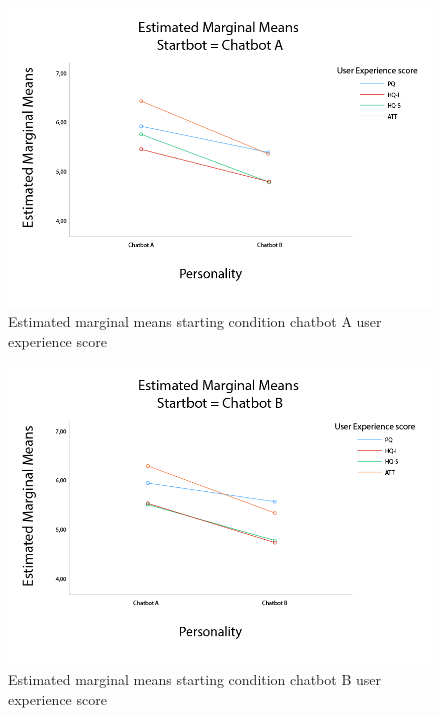 \begin{figure}[H]
    \centering
    \includegraphics[scale=0.4]{figures/MMeanStartbotA.png}
    \caption{Estimated marginal means starting condition chatbot A user experience score}
    \label{fig:startA}
\end{figure}

\begin{figure}[H]
    \centering
    \includegraphics[scale=0.4]{figures/MMeanStartbotB.png}
    \caption{Estimated marginal means starting condition chatbot B user experience score}
    \label{fig:startB}
\end{figure}

